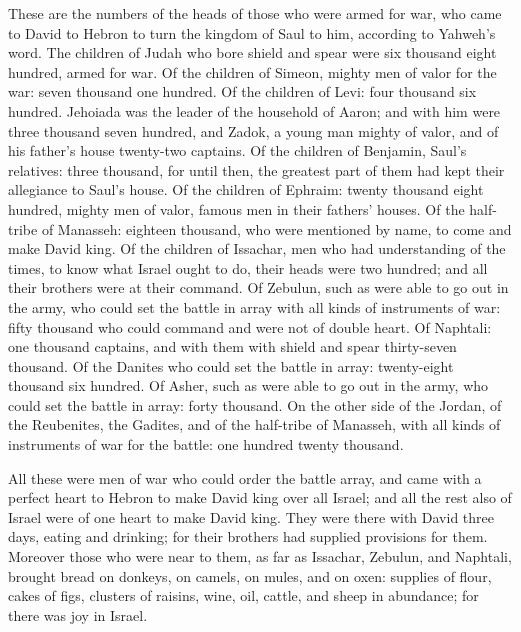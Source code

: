  These are the numbers of the heads of those who were
armed for war, who came to David to Hebron to turn the kingdom of Saul
to him, according to Yahweh's word.  The children of
Judah who bore shield and spear were six thousand eight hundred, armed
for war.  Of the children of Simeon, mighty men of valor
for the war: seven thousand one hundred.  Of the children
of Levi: four thousand six hundred.  Jehoiada was the
leader of the household of Aaron; and with him were three thousand seven
hundred,  and Zadok, a young man mighty of valor, and of
his father's house twenty-two captains.  Of the children
of Benjamin, Saul's relatives: three thousand, for until then, the
greatest part of them had kept their allegiance to Saul's house.
 Of the children of Ephraim: twenty thousand eight
hundred, mighty men of valor, famous men in their fathers' houses.
 Of the half-tribe of Manasseh: eighteen thousand, who
were mentioned by name, to come and make David king.  Of
the children of Issachar, men who had understanding of the times, to
know what Israel ought to do, their heads were two hundred; and all
their brothers were at their command.  Of Zebulun, such
as were able to go out in the army, who could set the battle in array
with all kinds of instruments of war: fifty thousand who could command
and were not of double heart.  Of Naphtali: one thousand
captains, and with them with shield and spear thirty-seven thousand.
 Of the Danites who could set the battle in array:
twenty-eight thousand six hundred.  Of Asher, such as
were able to go out in the army, who could set the battle in array:
forty thousand.  On the other side of the Jordan, of the
Reubenites, the Gadites, and of the half-tribe of Manasseh, with all
kinds of instruments of war for the battle: one hundred twenty thousand.

 All these were men of war who could order the battle
array, and came with a perfect heart to Hebron to make David king over
all Israel; and all the rest also of Israel were of one heart to make
David king.  They were there with David three days,
eating and drinking; for their brothers had supplied provisions for
them.  Moreover those who were near to them, as far as
Issachar, Zebulun, and Naphtali, brought bread on donkeys, on camels, on
mules, and on oxen: supplies of flour, cakes of figs, clusters of
raisins, wine, oil, cattle, and sheep in abundance; for there was joy in
Israel.

